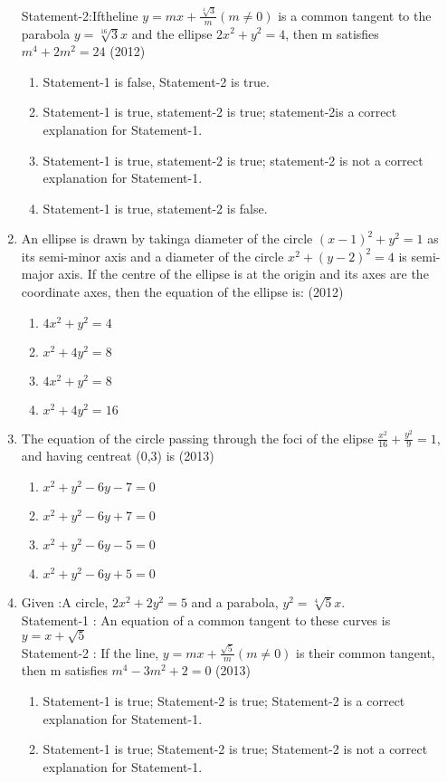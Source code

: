 \documentclass[12pt]{article}
\begin{document}
\begin{enumerate}
Statement-2:Iftheline $y=mx+\frac{\sqrt[4]{3}}{m}(m\neq 0)$ is a common tangent to the parabola $y=\sqrt[16]{3}x$ and the ellipse $2x^2+y^2=4$, then m satisfies $m^4+2m^2=24$
(2012)
\begin{enumerate}
\item Statement-1 is false, Statement-2 is true.
\item Statement-1 is true, statement-2 is true; statement-2is a correct explanation for Statement-1.
\item Statement-1 is true, statement-2 is true; statement-2 is not a correct explanation for Statement-1.
\item Statement-1 is true, statement-2 is false.
\end{enumerate}
\item An ellipse is drawn by takinga diameter of the circle $(x-1)^2+y^2=1$ as its semi-minor axis and a diameter of the circle $x^2+(y-2)^2=4$ is semi-major axis. If the centre of the ellipse is at the origin and its axes are the coordinate axes, then the
equation of the ellipse is: (2012)
\begin{enumerate}
\item $4x^2+y^2=4$
\item $x^2+4y^2=8$
\item $4x^2+y^2=8$
\item $x^2+4y^2=16$
\end{enumerate}
\item The equation of the circle passing through the foci of the elipse $\frac{x^2}{16}+\frac{y^2}{9}=1$, and having centreat (0,3) is (2013)
\begin{enumerate}
\item $x^2+y^2-6y-7=0$
\item $x^2+y^2-6y+7=0$
\item $x^2+y^2-6y-5=0$
\item $x^2+y^2-6y+5=0$
\end{enumerate}
\item Given :A circle, $2x^2+2y^2=5$ and a parabola, $y^2=\sqrt[4]{5}x$.\\
Statement-1 : An equation of a common tangent to these curves is $y=x+\sqrt{5}$\\
Statement-2 : If the line, $y=mx+\frac{\sqrt{5}}{m} (m\neq 0)$ is their common tangent, then m satisfies $m^4-3m^2+2=0$ (2013)
\begin{enumerate}
\item Statement-1 is true; Statement-2 is true; Statement-2 is a correct explanation for Statement-1.
\item  Statement-1 is true; Statement-2 is true; Statement-2 is not a correct explanation for Statement-1.

\end{enumerate}
\end{enumerate}
\end{document}
